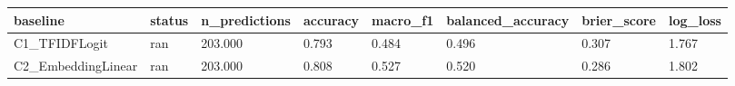 \begin{tabular}{llllllll}
\toprule
baseline & status & n_predictions & accuracy & macro_f1 & balanced_accuracy & brier_score & log_loss \\
\midrule
C1_TFIDFLogit & ran & 203.000 & 0.793 & 0.484 & 0.496 & 0.307 & 1.767 \\
C2_EmbeddingLinear & ran & 203.000 & 0.808 & 0.527 & 0.520 & 0.286 & 1.802 \\
\bottomrule
\end{tabular}
